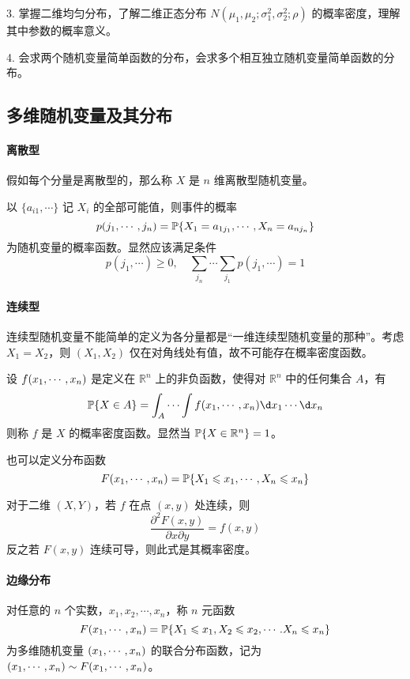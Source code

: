 3. 掌握二维均匀分布，了解二维正态分布 $N(\mu_1, \mu_2; \sigma_1^2, \sigma_2^2; \rho)$ 的概率密度，理解其中参数的概率意义。

4. 会求两个随机变量简单函数的分布，会求多个相互独立随机变量简单函数的分布。

\subsection{多维随机变量及其分布}

\paragraph{离散型}

假如每个分量是离散型的，那么称 $X$ 是 $n$ 维离散型随机变量。

\begin{definition}
	以 $\{a_{i1}, \cdots\}$ 记 $X_i$ 的全部可能值，则事件的概率
	\[ p(j_1,\cdots,j_n) = \mathbb{P}\{X_1 = a_{1j_1}, \cdots, X_n = a_{n j_n}\} \]
	为随机变量的概率函数。显然应该满足条件
	\[ p(j_1, \cdots) \geqslant 0, \quad \sum_{j_n} \cdots \sum_{j_1} p(j_1, \cdots)  =1 \]
\end{definition}

\paragraph{连续型}
连续型随机变量不能简单的定义为各分量都是“一维连续型随机变量的那种”。考虑 $X_1 = X_2$，则 $(X_1, X_2)$ 仅在对角线处有值，故不可能存在概率密度函数。

\begin{definition}
	设 $f(x_1,\cdots,x_n)$ 是定义在 $\mathbb{R}^n$ 上的非负函数，使得对 $\mathbb{R}^n$ 中的任何集合 $A$，有
	\[ \bbP\{X \in A\} = \int_A \cdots \int f(\seq{x}{n}) \d x_1 \cdots \d x_n \]
	则称 $f$ 是 $X$ 的概率密度函数。显然当 $\mathbb{P}\{ X \in \mathbb{R}^n\} = 1$。
\end{definition}

也可以定义分布函数
\[ F(x_1,\cdots,x_n) = \mathbb{P}\{X_1 \leqslant x_1, \cdots, X_n \leqslant x_n \} \]

对于二维 $(X, Y)$，若 $f$ 在点 $(x, y)$ 处连续，则
\[ \frac{\partial^2 F(x, y)}{\partial x \partial y} = f(x, y) \]
反之若 $F(x, y)$ 连续可导，则此式是其概率密度。

\paragraph{边缘分布}

对任意的 $n$ 个实数，$x_1, x_2, \cdots, x_n$，称 $n$ 元函数
\[ F(x_1,\cdots,x_n) = \mathbb{P}\{X_1 \leqslant x_1, X_2 \leqslant x_2, \cdots. X_n \leqslant x_n\} \]
为多维随机变量 $(x_1,\cdots,x_n)$ 的联合分布函数，记为 $(x_1,\cdots,x_n) \sim F(x_1,\cdots,x_n)$。

